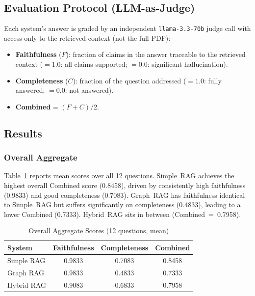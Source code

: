 \documentclass[conference]{IEEEtran}
\begin{document}
\subsection{Evaluation Protocol (LLM-as-Judge)}
\label{sec:metrics}

Each system's answer is graded by an independent \texttt{llama-3.3-70b}
judge call with access only to the retrieved context (not the full PDF):

\begin{itemize}
  \item \textbf{Faithfulness} ($F$): fraction of claims in the answer
  traceable to the retrieved context ($=1.0$: all claims supported;
  $=0.0$: significant hallucination).
  \item \textbf{Completeness} ($C$): fraction of the question addressed
  ($=1.0$: fully answered; $=0.0$: not answered).
  \item \textbf{Combined} = $(F + C) / 2$.
\end{itemize}

\subsection{Results}
\label{sec:results}

\subsubsection{Overall Aggregate}

Table~\ref{tab:results_main} reports mean scores over all 12 questions.
Simple~RAG achieves the highest overall Combined score (0.8458), driven
by consistently high faithfulness (0.9833) and good completeness
(0.7083). Graph~RAG has faithfulness identical to Simple~RAG but suffers
significantly on completeness (0.4833), leading to a lower Combined
(0.7333). Hybrid~RAG sits in between (Combined~=~0.7958).

\begin{table}[htbp]
  \caption{Overall Aggregate Scores (12 questions, mean)}
  \label{tab:results_main}
  \centering
  \begin{tabular}{lccc}
    \toprule
    \textbf{System} & \textbf{Faithfulness} & \textbf{Completeness}
      & \textbf{Combined} \\
    \midrule
    Simple RAG  & 0.9833 & 0.7083 & 0.8458 \\
    Graph RAG   & 0.9833 & 0.4833 & 0.7333 \\
    Hybrid RAG  & 0.9083 & 0.6833 & 0.7958 \\
    \bottomrule
  \end{tabular}
\end{table}
\end{document}
